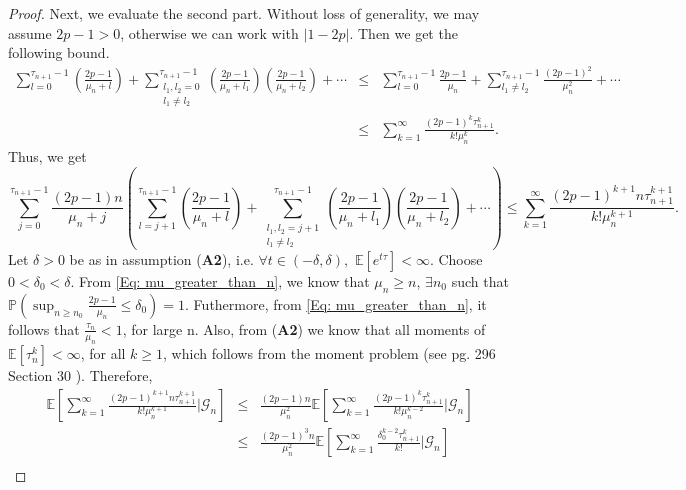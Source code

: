 \documentclass{article}
\numberwithin{equation}{section}
\newcommand{\GG}{\mbox{${\mathcal G}$}}
\newcommand{\1}{\mathbf{1}}
\newcommand{\0}{\mathbf{0}}
\newcommand{\PP}{\mbox{${\mathbb P}$}}
\newcommand{\E}{\mbox{${\mathbb E}$}}
\begin{document}
\begin{proof}

Next, we evaluate the second part. Without loss of generality, we may assume $2p-1>0$, otherwise we can work with $|1-2p|$. Then we get the following bound.
\begin{eqnarray*}
    \sum_{l=0}^{\tau_{n+1}-1} \left(\frac{2p-1}{\mu_n+l} \right) +\sum_{\substack{l_1, l_2 = 0 \\ l_1 \neq l_2}}^{\tau_{n+1}-1} \left(\frac{2p-1}{\mu_n+l_1} \right)\left(\frac{2p-1}{\mu_n+l_2} \right)+\cdots
    &\leq&  \sum_{l=0}^{\tau_{n+1}-1} \frac{2p-1}{\mu_n} +\sum_{ l_1\neq l_2}^{\tau_{n+1}-1} \frac{(2p-1)^2}{\mu_n^2} +\cdots \\
    &\leq& \sum_{k=1}^\infty \frac{(2p-1)^k\tau_{n+1}^k}{k!\mu_n^k}.  
\end{eqnarray*}
Thus, we get 
\begin{equation}
    \sum_{j=0}^{\tau_{n+1}-1} \frac{(2p-1)n}{\mu_n+j}\left(\sum_{l=j+1}^{\tau_{n+1}-1} \left(\frac{2p-1}{\mu_n+l} \right) +\sum_{\substack{l_1, l_2 = j+1 \\ l_1\neq l_2}}^{\tau_{n+1}-1} \left(\frac{2p-1}{\mu_n+l_1} \right)\left(\frac{2p-1}{\mu_n+l_2} \right)+\cdots\right) \leq \sum_{k=1}^\infty \frac{(2p-1)^{k+1}n\tau_{n+1}^{k+1}}{k!\mu_n^{k+1}}.
\end{equation}
Let $\delta>0$ be as in assumption (\textbf{A2}), i.e.  $\forall t\in (-\delta,\delta),$ $ \E[e^{t\tau}] < \infty$. Choose $0 <\delta_0 < \delta$. 
From \eqref{Eq: mu_greater_than_n}, we know that $\mu_n \ge n$, $\exists n_0$ such that $\PP \left(\sup_{n \ge n_0}\frac{2p-1}{\mu_n} \leq \delta_0 \right) =1$. Futhermore, from \eqref{Eq: mu_greater_than_n}, it follows that $\frac{\tau_n}{\mu_n} <1$, for large n. Also, from (\textbf{A2}) we know that all moments of $\E \left[\tau_n^k\right] < \infty$, for all $k \ge 1$, which follows from the moment problem (see pg. 296 Section 30 \cite{Bil_2012}). Therefore, 
\begin{eqnarray}
\label{Eq: Bound_term_second}
    \E\left[\sum_{k=1}^\infty \frac{(2p-1)^{k+1}n\tau_{n+1}^{k+1}}{k!\mu_n^{k+1}} \Big\vert \GG_n\right] &\leq& \frac{(2p-1)n}{\mu_n^2} \E\left[\sum_{k=1}^\infty \frac{(2p-1)^{k}\tau_{n+1}^{k}}{k!\mu_n^{k-2}} \Big\vert \GG_n\right] \nonumber \\
    &\leq& \frac{(2p-1)^3n}{\mu_n^2} \E\left[\sum_{k=1}^\infty \frac{\delta_0^{k-2}\tau_{n+1}^{k}}{k!} \Big\vert \GG_n\right] \nonumber\\

\end{eqnarray}
\end{proof}
\end{document}
